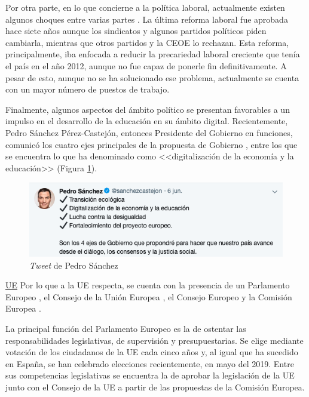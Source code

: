 \clearpage

Por otra parte, en lo que concierne a la política laboral, actualmente existen algunos choques entre varias partes \cite{manuelvgomez2019}. La última reforma laboral fue aprobada hace siete años aunque los sindicatos y algunos partidos políticos piden cambiarla, mientras que otros partidos y la \acf{CEOE} lo rechazan. Esta reforma, principalmente, iba enfocada a reducir la precariedad laboral creciente que tenía el país en el año 2012, aunque no fue capaz de ponerle fin definitivamente. A pesar de esto, aunque no se ha solucionado ese problema, actualmente se cuenta con un mayor número de puestos de trabajo.

Finalmente, algunos aspectos del ámbito político se presentan favorables a un impulso en el desarrollo de la educación en su ámbito digital. Recientemente, Pedro Sánchez Pérez-Castejón, entonces Presidente del Gobierno en funciones, comunicó los cuatro ejes principales de la propuesta de Gobierno \cite{tweetsanchez2019}, entre los que se encuentra lo que ha denominado como <<digitalización de la economía y la educación>> (Figura \ref{fig:tweetsanchez}).

\begin{figure}[h]
  \centering
  \includegraphics[width=0.8\linewidth]{figures/images/tweet_sanchez.png}
  \caption{\textit{Tweet} de Pedro Sánchez}
  \label{fig:tweetsanchez}
\end{figure}

\clearpage

\noindent\underline{\acs{UE}}\newline
\indent Por lo que a la \acs{UE} respecta, se cuenta con la presencia de un Parlamento Europeo \cite{parlamentoue}, el Consejo de la Unión Europea \cite{consejoue}, el Consejo Europeo \cite{consejoeuropeo} y la Comisión Europea \cite{comisionue}. 

La principal función del Parlamento Europeo es la de ostentar las responsabilidades legislativas, de supervisión y presupuestarias. Se elige mediante votación de los ciudadanos de la \acs{UE} cada cinco años y, al igual que ha sucedido en España, se han celebrado elecciones recientemente, en mayo del 2019. Entre sus competencias legislativas se encuentra la de aprobar la legislación de la \acs{UE} junto con el Consejo de la \acs{UE} a partir de las propuestas de la Comisión Europea.

